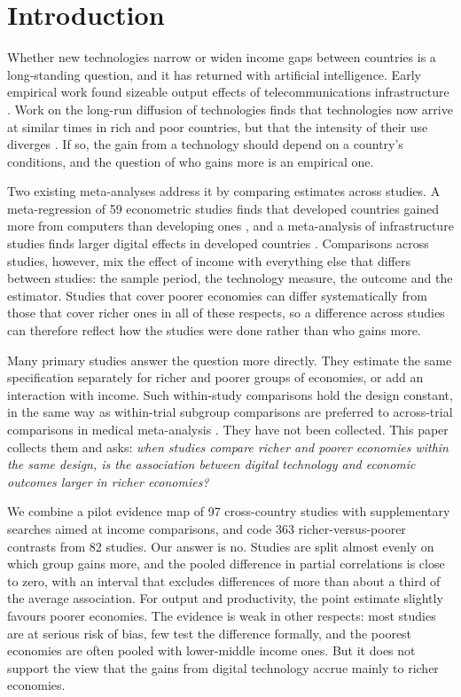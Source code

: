 \documentclass[11pt,a4paper]{article}
\begin{document}
\newpage

\section{Introduction}

Whether new technologies narrow or widen income gaps between countries is a long-standing question, and it has returned with artificial intelligence. Early empirical work found sizeable output effects of telecommunications infrastructure \cite{roller2001}. Work on the long-run diffusion of technologies finds that technologies now arrive at similar times in rich and poor countries, but that the intensity of their use diverges \cite{comin2010,comin2018}. If so, the gain from a technology should depend on a country's conditions, and the question of who gains more is an empirical one.

Two existing meta-analyses address it by comparing estimates across studies. A meta-regression of 59 econometric studies finds that developed countries gained more from computers than developing ones \cite{stanley2018}, and a meta-analysis of infrastructure studies finds larger digital effects in developed countries \cite{foster2026}. Comparisons across studies, however, mix the effect of income with everything else that differs between studies: the sample period, the technology measure, the outcome and the estimator. Studies that cover poorer economies can differ systematically from those that cover richer ones in all of these respects, so a difference across studies can therefore reflect how the studies were done rather than who gains more.

Many primary studies answer the question more directly. They estimate the same specification separately for richer and poorer groups of economies, or add an interaction with income. Such within-study comparisons hold the design constant, in the same way as within-trial subgroup comparisons are preferred to across-trial comparisons in medical meta-analysis \cite{fisher2017}. They have not been collected. This paper collects them and asks: \emph{when studies compare richer and poorer economies within the same design, is the association between digital technology and economic outcomes larger in richer economies?}

We combine a pilot evidence map of 97 cross-country studies with supplementary searches aimed at income comparisons, and code 363 richer-versus-poorer contrasts from 82 studies. Our answer is no. Studies are split almost evenly on which group gains more, and the pooled difference in partial correlations is close to zero, with an interval that excludes differences of more than about a third of the average association. For output and productivity, the point estimate slightly favours poorer economies. The evidence is weak in other respects: most studies are at serious risk of bias, few test the difference formally, and the poorest economies are often pooled with lower-middle income ones. But it does not support the view that the gains from digital technology accrue mainly to richer economies.
\end{document}
